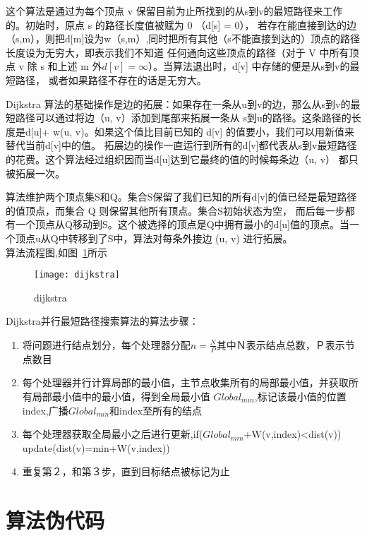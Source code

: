     这个算法是通过为每个顶点 v 保留目前为止所找到的从s到v的最短路径来工作的。初始时，原点 s 的路径长度值被赋为 0 （d[s] = 0），
若存在能直接到达的边（s,m），则把d[m]设为w（s,m）,同时把所有其他（s不能直接到达的）顶点的路径长度设为无穷大，即表示我们不知道
任何通向这些顶点的路径（对于 V 中所有顶点 v 除 s 和上述 m 外$ d[v] =\infty $）。当算法退出时，d[v] 中存储的便是从s到v的最短路径，
或者如果路径不存在的话是无穷大。 

    Dijkstra 算法的基础操作是边的拓展：如果存在一条从u到v的边，那么从s到v的最短路径可以通过将边（u, v）添加到尾部来拓展一条从
s到u的路径。这条路径的长度是d[u]+ w(u, v)。如果这个值比目前已知的 d[v] 的值要小，我们可以用新值来替代当前d[v]中的值。
拓展边的操作一直运行到所有的d[v]都代表从s到v最短路径的花费。这个算法经过组织因而当d[u]达到它最终的值的时候每条边（u, v）
都只被拓展一次。 

算法维护两个顶点集S和Q。集合S保留了我们已知的所有d[v]的值已经是最短路径的值顶点，而集合 Q 则保留其他所有顶点。集合S初始状态为空，
而后每一步都有一个顶点从Q移动到S。这个被选择的顶点是Q中拥有最小的d[u]值的顶点。当一个顶点u从Q中转移到了S中，算法对每条外接边 (u, v)
进行拓展。
\\
    算法流程图,如图~\ref{fig:dijkstra}所示

    \begin{figure}[htbp]
    \centering
    \texttt{[image: dijkstra]}
    \caption{dijkstra}\label{fig:dijkstra}
    \vspace{\baselineskip}
    \end{figure}

    Dijkstra并行最短路径搜索算法的算法步骤：
    \begin{enumerate}
    \item 将问题进行结点划分，每个处理器分配$n=\frac{N}{P}$其中Ｎ表示结点总数，Ｐ表示节点数目
    \item 每个处理器并行计算局部的最小值，主节点收集所有的局部最小值，并获取所有局部最小值中的最小值，得到全局最小值
            $Global_{min}$,标记该最小值的位置index,广播$Global_{min}$和index至所有的结点
    \item 每个处理器获取全局最小之后进行更新,if($Global_{min}$+W(v,index)<dist(v)) update(dist(v)=min+W(v,index))
    \item 重复第２，和第３步，直到目标结点被标记为止
    \end{enumerate}
            
\section{算法伪代码}

